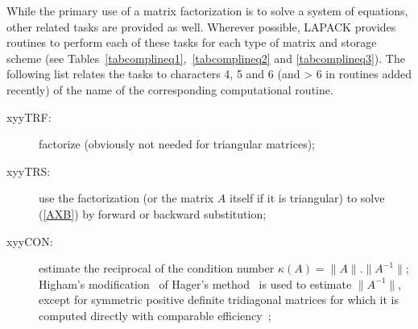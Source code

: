 While the primary use of a matrix factorization is to solve a system
of equations, other related tasks are provided as well.
Wherever possible, LAPACK provides routines to perform each of these
tasks for each type of matrix and storage scheme 
(see Tables~\ref{tabcomplineq1},~\ref{tabcomplineq2} and \ref{tabcomplineq3}).
The following list relates the tasks  to characters 4, 5 and 6 (and > 6 in routines added recently)
of the name of the corresponding computational routine.

\begin{description}

\item[xyyTRF:] factorize (obviously not needed for triangular matrices);

\item[xyyTRS:] use the factorization (or the matrix $A$ itself if it is triangular) 
to solve (\ref{AXB}) by forward or backward substitution;

\item[xyyCON:] estimate the reciprocal of the condition number $\kappa(A) = \|A\| . \|A^{-1} \|$;
Higham's modification~\cite{nick2} of Hager's method~\cite{hager84} is used to 
estimate $\|A^{-1}\|$,
except for symmetric positive definite tridiagonal matrices
for which it is computed directly with comparable efficiency~\cite{higham3};


\end{description}
